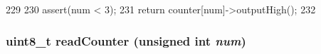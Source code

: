 \begin{DoxyCode}
229     {
230         assert(num < 3);
231         return counter[num]->outputHigh();
232     }
\end{DoxyCode}
\hypertarget{classIntel8254Timer_a4794298e519275c38d6d8a8f169fd53b}{
\subsubsection[{readCounter}]{\setlength{\rightskip}{0pt plus 5cm}uint8\_\-t readCounter (unsigned int {\em num})}}
\label{classIntel8254Timer_a4794298e519275c38d6d8a8f169fd53b}



